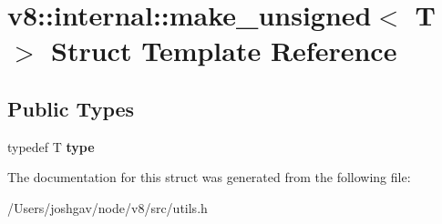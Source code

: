 \hypertarget{structv8_1_1internal_1_1make__unsigned}{}\section{v8\+:\+:internal\+:\+:make\+\_\+unsigned$<$ T $>$ Struct Template Reference}
\label{structv8_1_1internal_1_1make__unsigned}
\subsection*{Public Types}
\begin{DoxyCompactItemize}
\item 
typedef T {\bfseries type}\hypertarget{structv8_1_1internal_1_1make__unsigned_aeae3856d85550a0f3cd85202506128e9}{}\label{structv8_1_1internal_1_1make__unsigned_aeae3856d85550a0f3cd85202506128e9}

\end{DoxyCompactItemize}


The documentation for this struct was generated from the following file\+:\begin{DoxyCompactItemize}
\item 
/\+Users/joshgav/node/v8/src/utils.\+h\end{DoxyCompactItemize}

